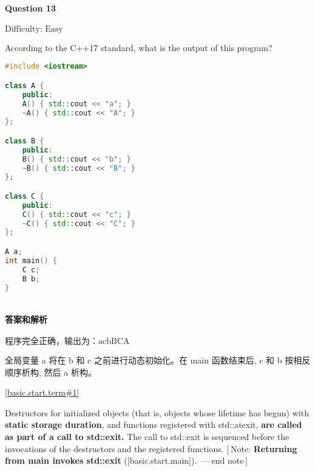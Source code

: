 \documentclass{article}
\begin{document}
	\paragraph*{Question 13} $\boxed{\text{Difficulty: Easy}} $			
	
	According to the C++17 standard, what is the output of this program?
	
	\begin{lstlisting}[language=C++]  		
#include <iostream>

class A {
	public:
	A() { std::cout << "a"; }
	~A() { std::cout << "A"; }
};

class B {
	public:
	B() { std::cout << "b"; }
	~B() { std::cout << "B"; }
};

class C {
	public:
	C() { std::cout << "c"; }
	~C() { std::cout << "C"; }
};

A a;
int main() {
	C c;
	B b;
}
		
	\end{lstlisting}
	
	\paragraph*{答案和解析} $\boxed{\text{程序完全正确，输出为：acbBCA}} $
	
	全局变量 a 将在 b 和 c 之前进行动态初始化。在 main 函数结束后, c 和 b 按相反顺序析构, 然后 a 析构。
	
	\href{https://timsong-cpp.github.io/cppwp/n4659/basic.start.term#1}{[basic.start.term\#1]}
	\begin{lightgrayleftbar}
		Destructors for initialized objects (that is, objects whose lifetime has begun) with \textbf{static storage duration}, and functions registered with std​::​atexit, \textbf{are called as part of a call to std​::​exit.} The call to std​::​exit is sequenced before the invocations of the destructors and the registered functions. [ Note: \textbf{Returning from main invokes std​::​exit} ([basic.start.main]).  — end note ] 
	\end{lightgrayleftbar} 
\end{document}
